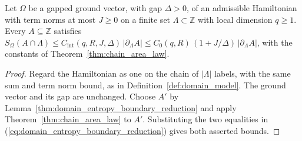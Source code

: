 \begin{theorem}
    \label{thm:domain_area_law}
    \leanok
    Let $\Omega$ be a gapped ground vector, with gap $\Delta>0$, of an
    admissible Hamiltonian with term norms at most $J\ge0$ on a finite set
    $\Lambda\subset\mathbb Z$ with local dimension $q\ge1$. Every
    $A\subseteq\mathbb Z$ satisfies
    $S_\Omega(A\cap\Lambda)\le C_{\mathrm{int}}(q,R,J,\Delta)\,
        |\partial_\Lambda A|\le C_0(q,R)\,(1+J/\Delta)\,|\partial_\Lambda A|$,
    with the constants of Theorem~\ref{thm:chain_area_law}.
\end{theorem}
\begin{proof}
    \leanok
    Regard the Hamiltonian as one on the chain of $|\Lambda|$ labels,
    with the same sum and term norm bound, as in
    Definition~\ref{def:domain_model}. The ground vector and its gap
    are unchanged. Choose $A'$ by
    Lemma~\ref{thm:domain_entropy_boundary_reduction} and apply
    Theorem~\ref{thm:chain_area_law} to $A'$. Substituting the two
    equalities in (\ref{eq:domain_entropy_boundary_reduction}) gives
    both asserted bounds.
\end{proof}

